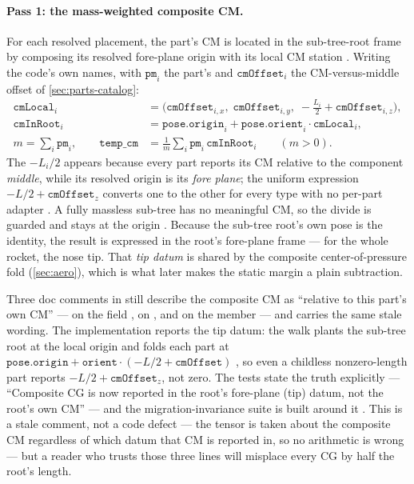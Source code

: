 \paragraph{Pass 1: the mass-weighted composite CM.} For each resolved placement, the part's
CM is located in the sub-tree-root frame by composing its resolved fore-plane origin with its
local CM station . Writing the code's own names, with
$\mathtt{pm}_i$ the part's  and $\mathtt{cmOffset}_i$ the CM-versus-middle
offset of \cref{sec:parts-catalog}:
\begin{align}
\mathtt{cmLocal}_i &= \Big(\mathtt{cmOffset}_{i,x},\; \mathtt{cmOffset}_{i,y},\;
  -\tfrac{L_i}{2} + \mathtt{cmOffset}_{i,z}\Big), \\
\mathtt{cmInRoot}_i &= \mathtt{pose.origin}_i + \mathtt{pose.orient}_i \cdot \mathtt{cmLocal}_i, \\
m = \sum_i \mathtt{pm}_i, \qquad
\mathtt{temp\_cm} &= \frac{1}{m} \sum_i \mathtt{pm}_i \, \mathtt{cmInRoot}_i \qquad (m > 0).
\end{align}
The $-L_i/2$ appears because every part reports its CM relative to the component
\emph{middle}, while its resolved origin is its \emph{fore plane}; the uniform expression
$-L/2 + \mathtt{cmOffset}_z$ converts one to the other for every type with no per-part adapter
. A fully massless sub-tree has no meaningful CM, so the divide is
guarded and  stays at the origin . Because the
sub-tree root's own pose is the identity, the result is expressed in the root's fore-plane
frame --- for the whole rocket, the nose tip. That \emph{tip datum} is shared by the composite
center-of-pressure fold (\cref{sec:aero}), which is what later makes the static margin a plain
subtraction.

\begin{keyinsight}
Three doc comments in  still describe the composite CM as ``relative
to this part's own CM'' --- on the  field
, on  , and on
the  member  --- and 
carries the same stale wording. The implementation reports the tip datum: the walk plants the
sub-tree root at the local origin  and folds each part at
$\mathtt{pose.origin} + \mathtt{orient}\cdot(-L/2 + \mathtt{cmOffset})$
, so even a childless nonzero-length part reports
$-L/2 + \mathtt{cmOffset}_z$, not zero. The tests state the truth explicitly ---
``Composite CG is now reported in the root's fore-plane (tip) datum, not the root's own CM''
 --- and the migration-invariance suite is built around
it . This is a stale comment, not a code defect
--- the tensor is taken about the composite CM regardless of which datum that CM is reported
in, so no arithmetic is wrong --- but a reader who trusts those three lines will misplace
every CG by half the root's length.
\end{keyinsight}

